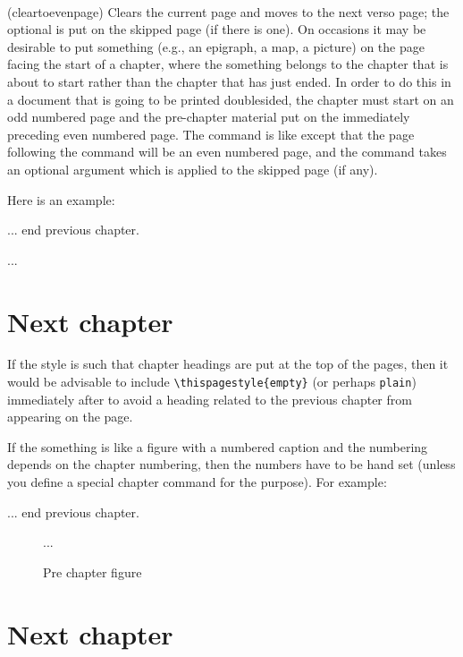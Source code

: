 \begin{syntax}
 \cmd{\cleartoevenpage} \\
\end{syntax}
\glossary(cleartoevenpage)%
  {}%
  {Clears the current page and moves to the next verso page; the optional
    is put on the skipped page (if there is one).}
 On occasions it may be desirable to put something (e.g., an epigraph, a map,
 a picture) on the page facing the start
 of a chapter, where the something belongs to the chapter that is about to 
 start rather than the chapter that has just ended. In order to do this 
 in a document that is going to be printed
 doublesided, the chapter must start on an odd numbered page and the 
 pre-chapter material put on the immediately preceding even numbered page.
 The \cmd{\cleartoevenpage} command is like \cmd{\cleardoublepage} except
 that the page following the command will be an even numbered page, and the
 command takes an optional argument 
 which is applied to the skipped page (if any).

    Here is an example:
\begin{lcode}
 ... end previous chapter.
 \cleartoevenpage
 \begin{center}
 \begin{picture}... \end{picture}
 \end{center}
 \chapter{Next chapter}
\end{lcode}
 If the style is such that chapter headings are put at the top of the pages,
 then it would be advisable to include \verb?\thispagestyle{empty}? 
(or perhaps \texttt{plain})
 immediately after \cmd{\cleartoevenpage} to avoid a heading related to the
 previous chapter from appearing on the page. 

 If the something is like a figure with a numbered caption and the numbering
 depends on the chapter numbering, then the numbers have to be hand set (unless
 you define a special chapter command for the purpose). For example:
\begin{lcode}
 ... end previous chapter.
 \cleartoevenpage[\thispagestyle{empty}] %
 \thispagestyle{plain}
 \addtocounter{chapter}{1} %
 \setcounter{figure}{0}    %
 \begin{figure}
 ...
 \caption{Pre chapter figure}
 \end{figure}

 \addtocounter{chapter}{-1} %
 \chapter{Next chapter}     %
 \addtocounter{figure}{1}   %
\end{lcode}
 


